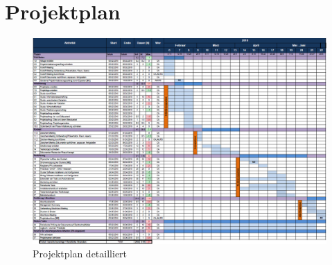 \section{Projektplan}
\begin{figure}[H]
	\centering
	\includegraphics[scale=0.62,angle=90]{Bilder/Projektplan.png}
	\caption{Projektplan detailliert}
\end{figure}
